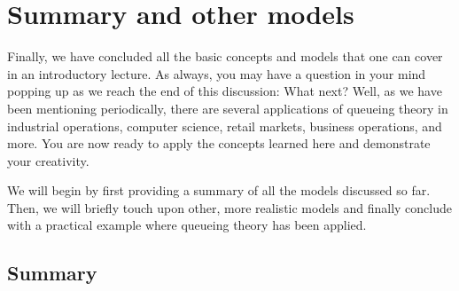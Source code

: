 \documentclass[11pt, a4paper]{report}
\begin{document}

\chapter{Summary and other models}

Finally, we have concluded all the basic concepts and models that one can cover in an introductory lecture. As always, you may have a question in your mind popping up as we reach the end of this discussion: What next? Well, as we have been mentioning periodically, there are several applications of queueing theory in industrial operations, computer science, retail markets, business operations, and more. You are now ready to apply the concepts learned here and demonstrate your creativity. 

We will begin by first providing a summary of all the models discussed so far. Then, we will briefly touch upon other, more realistic models and finally conclude with a practical example where queueing theory has been applied.

\section{Summary}
\end{document}
